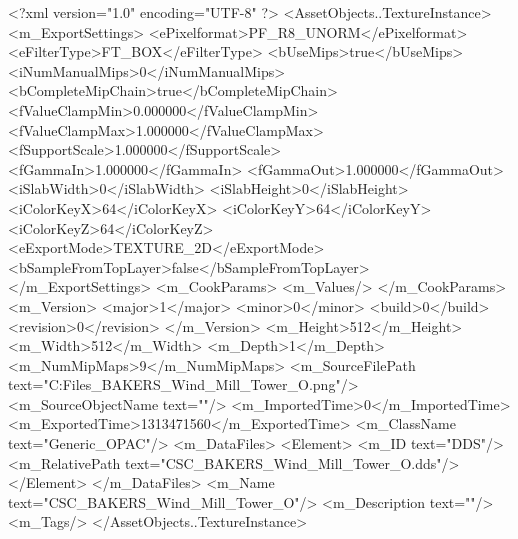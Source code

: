 <?xml version="1.0" encoding="UTF-8" ?>
<AssetObjects..TextureInstance>
	<m_ExportSettings>
		<ePixelformat>PF_R8_UNORM</ePixelformat>
		<eFilterType>FT_BOX</eFilterType>
		<bUseMips>true</bUseMips>
		<iNumManualMips>0</iNumManualMips>
		<bCompleteMipChain>true</bCompleteMipChain>
		<fValueClampMin>0.000000</fValueClampMin>
		<fValueClampMax>1.000000</fValueClampMax>
		<fSupportScale>1.000000</fSupportScale>
		<fGammaIn>1.000000</fGammaIn>
		<fGammaOut>1.000000</fGammaOut>
		<iSlabWidth>0</iSlabWidth>
		<iSlabHeight>0</iSlabHeight>
		<iColorKeyX>64</iColorKeyX>
		<iColorKeyY>64</iColorKeyY>
		<iColorKeyZ>64</iColorKeyZ>
		<eExportMode>TEXTURE_2D</eExportMode>
		<bSampleFromTopLayer>false</bSampleFromTopLayer>
	</m_ExportSettings>
	<m_CookParams>
		<m_Values/>
	</m_CookParams>
	<m_Version>
		<major>1</major>
		<minor>0</minor>
		<build>0</build>
		<revision>0</revision>
	</m_Version>
	<m_Height>512</m_Height>
	<m_Width>512</m_Width>
	<m_Depth>1</m_Depth>
	<m_NumMipMaps>9</m_NumMipMaps>
	<m_SourceFilePath text="C:\Users\Shadow\Desktop\Working Files\Textures\CSC_BAKERS_Wind_Mill_Tower_O.png"/>
	<m_SourceObjectName text=""/>
	<m_ImportedTime>0</m_ImportedTime>
	<m_ExportedTime>1313471560</m_ExportedTime>
	<m_ClassName text="Generic_OPAC"/>
	<m_DataFiles>
		<Element>
			<m_ID text="DDS"/>
			<m_RelativePath text="CSC_BAKERS_Wind_Mill_Tower_O.dds"/>
		</Element>
	</m_DataFiles>
	<m_Name text="CSC_BAKERS_Wind_Mill_Tower_O"/>
	<m_Description text=""/>
	<m_Tags/>
</AssetObjects..TextureInstance>

